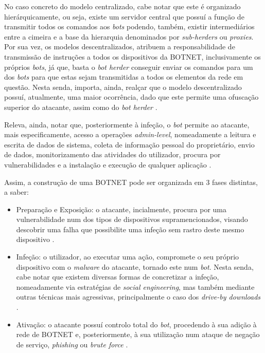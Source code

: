 No caso concreto do modelo centralizado, cabe notar que este é organizado hierárquicamente, ou seja, existe um servidor central que possuí a função de transmitir todos os comandos aos \textit{bots} podendo, também, existir intermediários entre a cimeira e a base da hierarquia denominados por \textit{sub-herders} ou \textit{proxies}. Por sua vez, os modelos descentralizados, atribuem a responsabilidade de transmissão de instruções a todos os dispositivos da BOTNET, inclusivamente os próprios \textit{bots}, já que, basta o \textit{bot herder} conseguir enviar os comandos para um dos \textit{bots} para que estas sejam transmitidas a todos os elementos da rede em questão. Nesta senda, importa, ainda, realçar que o modelo descentralizado possuí, atualmente, uma maior ocorrência, dado que este permite uma ofuscação superior do atacante, assim como do \textit{bot herder} \cite{kaspersky_botnets_2017}.


Releva, ainda, notar que, posteriormente à infeção, o \textit{bot} permite ao atacante, mais especificamente, acesso a operações \textit{admin-level}, nomeadamente a leitura e escrita de dados de sistema, coleta de informação pessoal do proprietário, envio de dados, monitorizamento das atividades do utilizador, procura por vulnerabilidades e a instalação e execução de qualquer aplicação \cite{kaspersky_botnets_2017}.

Assim, a construção de uma BOTNET pode ser organizada em 3 fases distintas, a saber:
\begin{itemize}
    \item Preparação e Exposição: o atacante, incialmente, procura por uma vulnerabilidade num dos tipos de dispositivos supramencionados, visando descobrir uma falha que possibilite uma infeção sem rastro deste mesmo dispositivo \cite{kaspersky_botnets_2017}.
    \item Infeção: o utilizador, ao executar uma ação, compromete o seu próprio dispositivo com o \textit{malware} do atacante, tornado este num \textit{bot}. Nesta senda, cabe notar que existem diversas formas de concretizar a infeção, nomeadamente via estratégias de \textit{social engineering}, mas também mediante outras técnicas mais agressivas, principalmente o caso dos \textit{drive-by downloads} \cite{kaspersky_botnets_2017}.
    \item Ativação: o atacante possuí controlo total do \textit{bot}, procedendo à sua adição à rede de BOTNET e, posteriormente, à sua utilização num ataque de negação de serviço, \textit{phishing} ou \textit{brute force} \cite{kaspersky_botnets_2017}.
\end{itemize}

